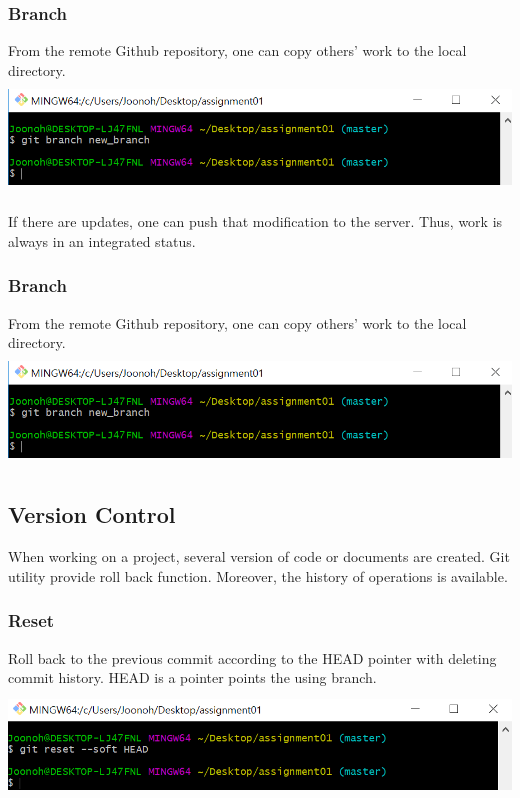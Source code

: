\documentclass[18pt]{article}%
\begin{document}
\subsubsection {Branch}
From the remote Github repository, one can copy others' work to the local directory.\\
\includegraphics[height=3cm]{branch.PNG}

If there are updates, one can push that modification to the server. Thus, work is always in an integrated status.

\subsubsection {Branch}
From the remote Github repository, one can copy others' work to the local directory.\\
\includegraphics[height=3cm]{branch.PNG}

 
 \subsection {Version Control}
When working on a project, several version of code or documents are created. Git utility provide roll back function. Moreover, the history of operations is available.

\subsubsection {Reset}
Roll back to the previous commit according to the HEAD pointer with deleting commit history. HEAD is a pointer points the using branch.\\
\includegraphics[height=3cm]{reset.PNG}
\end{document}
